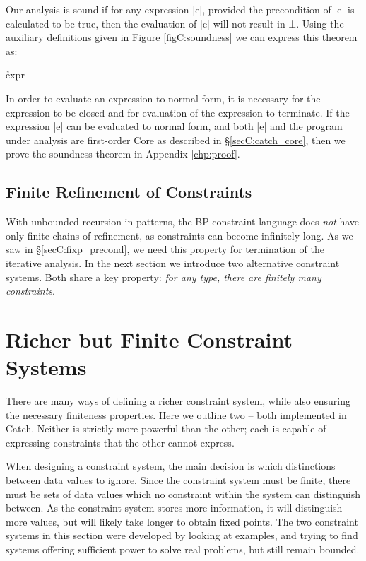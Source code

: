 Our analysis is sound if for any expression |e|, provided the precondition of |e| is calculated to be true, then the evaluation of |e| will not result in $\bot{}$. Using the auxiliary definitions given in Figure \ref{figC:soundness} we can express this theorem as:

\h{expr}

In order to evaluate an expression to normal form, it is necessary for the expression to be closed and for evaluation of the expression to terminate. If the expression |e| can be evaluated to normal form, and both |e| and the program under analysis are first-order Core as described in \S\ref{secC:catch_core}, then we prove the soundness theorem in Appendix \ref{chp:proof}.


\subsection{Finite Refinement of Constraints}
\label{secC:bounded}

With unbounded recursion in patterns, the BP-constraint language does \textit{not} have only finite chains of refinement, as constraints can become infinitely long. As we saw in \S\ref{secC:fixp_precond}, we need this property for termination of the iterative analysis. In the next section we introduce two alternative constraint systems. Both share a key property: \textit{for any type, there are finitely many constraints}.

\section{Richer but Finite Constraint Systems}
\label{secC:constraint}

There are many ways of defining a richer constraint system, while also ensuring the necessary finiteness properties. Here we outline two -- both implemented in Catch. Neither is strictly more powerful than the other; each is capable of expressing constraints that the other cannot express.

When designing a constraint system, the main decision is which distinctions between data values to ignore. Since the constraint system must be finite, there must be sets of data values which no constraint within the system can distinguish between. As the constraint system stores more information, it will distinguish more values, but will likely take longer to obtain fixed points. The two constraint systems in this section were developed by looking at examples, and trying to find systems offering sufficient power to solve real problems, but still remain bounded.


